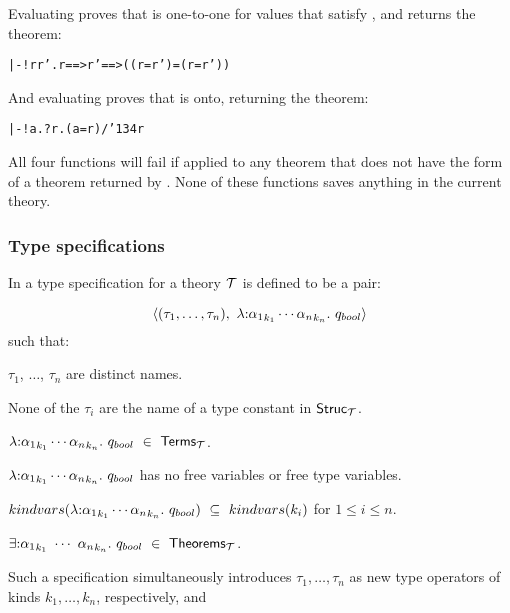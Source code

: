 \noindent Evaluating  proves that 
is one-to-one for values that satisfy , and returns the theorem:

{\def\bk{\char'134}
\begin{hol}\begin{alltt}
   |- !r r'.  r ==>  r' ==> (( r =  r') = (r = r'))
\end{alltt}\end{hol}}

\noindent And evaluating  proves that 
is onto, returning the theorem:

{\def\bk{\char'134}
\begin{hol}
\begin{alltt}
   |- !a. ?r. (a =  r) /\bk {} r
\end{alltt}
\end{hol}}

\noindent All four functions will fail if applied to any theorem that does not
have the form of a theorem returned by .
None of these functions saves anything in the current theory.


\subsubsection{Type specifications}
\label{type-specs}

%
%
In \LOGIC{} a type specification
%
%
for a theory ${\cal T}$ 
is defined to be a pair:

\[
\langle(\tau_1,\ldots,\tau_n),\ \lquant{{:}{\alpha_1}_{k_1}
\cdots {\alpha_n}_{k_n}}q_{bool}\rangle
\]
such that:

\begin{myenumerate}
\item $\tau_1$, $\dots$, $\tau_n$ are distinct names.
\item None of the $\tau_i$ are the name of a type constant in ${\sf Struc}_{\cal T}$.
\item $\lambda {:}{\alpha_1}_{k_1}
\cdots {\alpha_n}_{k_n}.\ q_{bool}\ \in\ {\sf Terms}_{\cal T}$.
\item $\lambda {:}{\alpha_1}_{k_1}
\cdots {\alpha_n}_{k_n}.\ q_{bool}$ has no free variables or free type variables.
\item $kindvars(\lambda {:}{\alpha_1}_{k_1}
\cdots {\alpha_n}_{k_n}.\ q_{bool})\ \subseteq\ kindvars(k_i)$ for
$1\leq i\leq n$.
\item $\equant{{:}{\alpha_1}_{k_1}\ \cdots\ {\alpha_n}_{k_n}}q_{bool}
\ \in\ {\sf Theorems}_{\cal T}$.
\end{myenumerate}
Such a specification
simultaneously introduces ${\tau_1},\ldots,{\tau_n}$ 
as new type operators of kinds
${k_1},\ldots,{k_n}$, respectively, and

